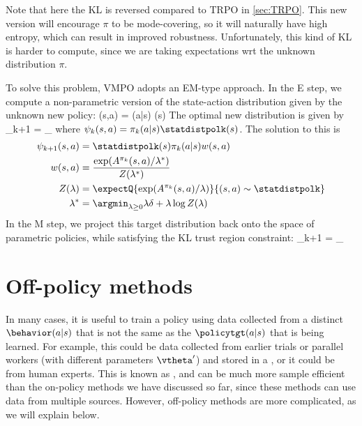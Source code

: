 Note that here the KL is reversed compared to TRPO
in \cref{sec:TRPO}.
This new version will encourage $\pi$
to be mode-covering, so it will naturally
have high entropy, which can result in improved robustness.
Unfortunately, this kind of KL is harder to compute,
since we are taking expectations wrt the unknown distribution $\pi$.

To solve this problem, VMPO adopts an EM-type approach.
In the E step, we compute a non-parametric version
of the state-action distribution given by the unknown
new policy:
\be
\psi(s,a) = \pi(a|s) \statdistpolk(s)
\ee
The optimal new distribution is given by
\be
\psi_{k+1} = \argmax_{\psi}
\myst {} \leq \delta
\ee
where
$\psi_k(s,a) = \pi_k(a|s) \statdistpolk(s)$.
The solution to this  is
\begin{align}
  \psi_{k+1}(s,a) &=  \statdistpolk(s) \pi_k(a|s) w(s,a) \\
  w(s,a) &= \frac{\exp(A^{\pi_k}(s,a)/\lambda^*)}{Z(\lambda^*)} \\
  Z(\lambda) &= \expectQ{\exp(A^{\pi_k}(s,a)/\lambda)}{(s,a)\sim
    \statdistpolk} \\
  \lambda^* &= \argmin_{\lambda \geq 0} \lambda \delta + \lambda \log Z(\lambda)
  \end{align}
In the M step, we project this target distribution back onto the space
of parametric policies, while satisfying the KL trust region
constraint:
\be
\pi_{k+1} = \argmax_{\pi}
\myst {} \leq \delta
\ee


\section{Off-policy methods}
\label{sec:offPolicy}
\label{sec:offpolicy}


In many cases, it is useful to train a policy
using data collected from a distinct
$\behavior(a|s)$ that is
not the same as the  $\policytgt(a|s)$
that is being learned.
For example, this could be data collected
from earlier trials or parallel workers
(with different parameters $\vtheta'$)
and stored in a ,
or it could be  from human experts.
This is known as ,
and can be much more sample efficient than the on-policy 
methods we have discussed so far, since these methods
can use data from multiple sources.
However, off-policy methods are more complicated,
as we will explain below.

